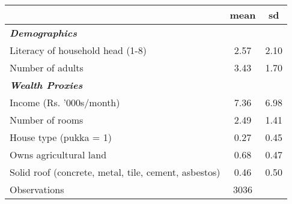 \def\sym#1{\ifmmode^{#1}\else\(^{#1}\)\fi}
\begin{adjustbox}{max
width={\textwidth},caption={Household Attributes\label {tab1}},nofloat=table}
\begin{tabular}{l*{1}{cc}}
\toprule
                    &        mean&          sd\\
\midrule
\textbf{\emph{Demographics}}&            &            \\
Literacy of household head (1-8)&        2.57&        2.10\\
Number of adults    &        3.43&        1.70\\
\textbf{\emph{Wealth Proxies}}&            &            \\
Income (Rs. '000s/month)&        7.36&        6.98\\
Number of rooms     &        2.49&        1.41\\
House type (pukka = 1)&        0.27&        0.45\\
Owns agricultural land&        0.68&        0.47\\
Solid roof (concrete, metal, tile, cement, asbestos)&        0.46&        0.50\\
\midrule
Observations        &        3036&            \\
\bottomrule
\end{tabular}\end{adjustbox}

